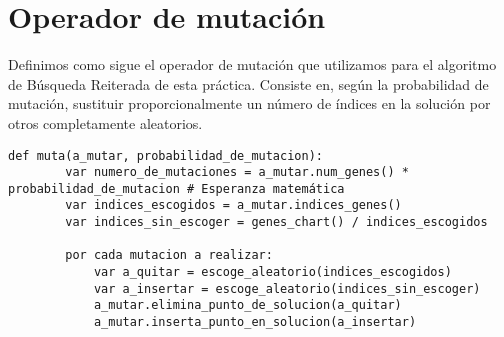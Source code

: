 \begin{minipage}{\textwidth}
\section{Operador de mutación}

Definimos como sigue el operador de mutación que utilizamos para el algoritmo de Búsqueda Reiterada
de esta práctica. Consiste en, según la probabilidad de mutación, sustituir proporcionalmente un
número de índices en la solución por otros completamente aleatorios.

\begin{lstlisting}[mathescape=true,caption={Definición del operador de mutación para nuestra implementación del algoritmo de Búsqueda Reiterada. Recordemos que la inserción y eliminación de elementos en una solucion está factorizada, y su definición la podemos encontrar en el Capítulo en el que describimos la Arquitectura de una Solución.},captionpos=b]
	def muta(a_mutar, probabilidad_de_mutacion):
		var numero_de_mutaciones = a_mutar.num_genes() * probabilidad_de_mutacion # Esperanza matemática
		var indices_escogidos = a_mutar.indices_genes()
		var indices_sin_escoger = genes_chart() / indices_escogidos

		por cada mutacion a realizar:
			var a_quitar = escoge_aleatorio(indices_escogidos)
			var a_insertar = escoge_aleatorio(indices_sin_escoger)
			a_mutar.elimina_punto_de_solucion(a_quitar)
			a_mutar.inserta_punto_en_solucion(a_insertar)
\end{lstlisting}
\end{minipage}